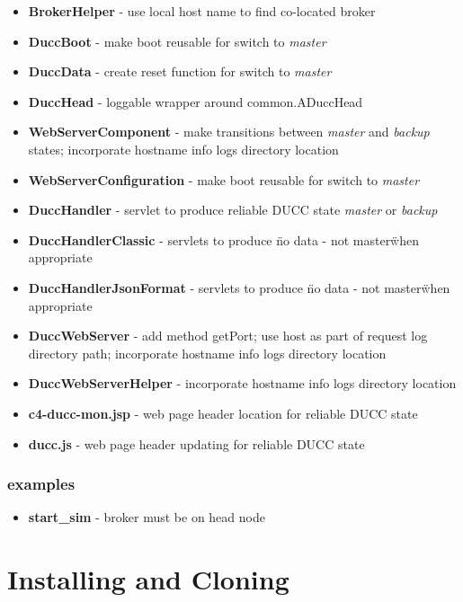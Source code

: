 \documentclass[letterpaper]{article}
\begin{document}
{\renewcommand\labelitemi{}
\begin{itemize}
  \item \textbf{BrokerHelper} - use local host name to find co-located broker
  \item \textbf{DuccBoot} - make boot reusable for switch to {\em master}
  \item \textbf{DuccData} - create reset function for switch to {\em master}
  \item \textbf{DuccHead} - loggable wrapper around common.ADuccHead
  \item \textbf{WebServerComponent} - make transitions between {\em master} and {\em backup} states; incorporate hostname info logs directory location
  \item \textbf{WebServerConfiguration} - make boot reusable for switch to {\em master}
  \item \textbf{DuccHandler} - servlet to produce reliable DUCC state {\em master} or {\em backup}
  \item \textbf{DuccHandlerClassic} - servlets to produce \"no data - not master\" when appropriate
  \item \textbf{DuccHandlerJsonFormat} - servlets to produce \"no data - not master\" when appropriate
  \item \textbf{DuccWebServer} - add method getPort; use host as part of request log directory path; incorporate hostname info logs directory location
   \item \textbf{DuccWebServerHelper} - incorporate hostname info logs directory location
  \item \textbf{c4-ducc-mon.jsp} - web page header location for reliable DUCC state
  \item \textbf{ducc.js} - web page header updating for reliable DUCC state
\end{itemize}
}

\subsubsection{examples}

{\renewcommand\labelitemi{}
\begin{itemize}
  \item \textbf{start\_sim} - broker must be on head node
\end{itemize}
}


\section{Installing and Cloning}
\end{document}
